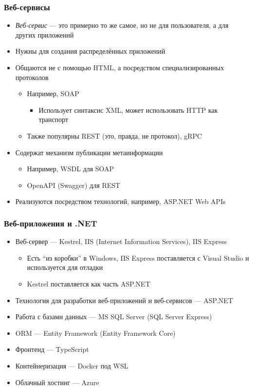 \documentclass{../../slides-style}
\begin{document}
    \begin{frame}
        \frametitle{Веб-сервисы}
        \begin{itemize}
            \item \textit{Веб-сервис} --- это примерно то же самое, но не для пользователя, а для других приложений
            \item Нужны для создания распределённых приложений
            \item Общаются не с помощью HTML, а посредством специализированных протоколов
            \begin{itemize}
                \item Например, SOAP
                \begin{itemize}
                    \item Использует синтаксис XML, может использовать HTTP как транспорт
                \end{itemize}
                \item Также популярны REST (это, правда, не протокол), gRPC
            \end{itemize}
            \item Содержат механизм публикации метаинформации
            \begin{itemize}
                \item Например, WSDL для SOAP
                \item OpenAPI (Swagger) для REST
            \end{itemize}
            \item Реализуются посредством технологий, например, ASP.NET Web APIs
        \end{itemize}
    \end{frame}

    \begin{frame}
        \frametitle{Веб-приложения и .NET}
        \begin{itemize}
            \item Веб-сервер --- Kestrel, IIS (Internet Information Services), IIS Express
            \begin{itemize}
                \item Есть \enquote{из коробки} в Windows, IIS Express поставляется с Visual Studio и используется для отладки
                \item Kestrel поставляется как часть ASP.NET
            \end{itemize}
            \item Технология для разработки веб-приложений и веб-сервисов --- ASP.NET
            \item Работа с базами данных --- MS SQL Server (SQL Server Express)
            \item ORM --- Entity Framework (Entity Framework Core)
            \item Фронтенд --- TypeScript
            \item Контейнеризация --- Docker под WSL
            \item Облачный хостинг --- Azure
        \end{itemize}
    \end{frame}
\end{document}
